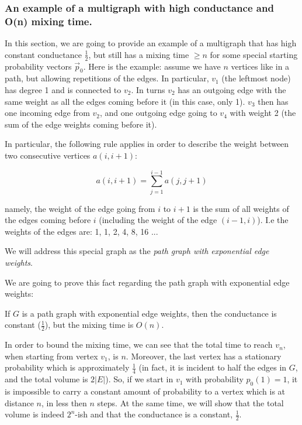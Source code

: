 \documentclass[../main.tex]{subfiles}
\begin{document}
\subsubsection{An example of a multigraph with high conductance and O(n) mixing time.}
\label{subsubsec:counter_example}

In this section, we are going to provide an example of a multigraph that has high constant conductance $\frac{1}{2}$, but still has a mixing time $\geq n$ for some special starting probability vectors $\vec{p}_0$. 
Here is the example: assume we have $n$ vertices like in a path, but allowing repetitions of the edges. In particular, $v_1$ (the leftmost node) has degree 1 and is connected to $v_2$. In turns $v_2$ has an outgoing edge with the same weight as all the edges coming before it (in this case, only 1). $v_3$ then has one incoming edge from $v_2$, and one outgoing edge going to $v_4$ with weight 2 (the sum of the edge weights coming before it).

In particular, the following rule applies in order to describe the weight between two consecutive vertices $a(i, i+1)$:

\begin{equation}
    a(i, i+1) = \sum_{j=1}^{i-1} a(j, j+1)
\end{equation}

namely, the weight of the edge going from $i$ to $i+1$ is the sum of all weights of the edges coming before $i$ (including the weight of the edge $(i-1, i)$). I.e the weights of the edges are: 1, 1, 2, 4, 8, 16 ...  

We will address this special graph as the \textit{path graph with exponential edge weights}.

We are going to prove this fact regarding the path graph with exponential edge weights:

\begin{claim}
\label{claim:path_graph_high_mixing_time}
    If $G$ is a path graph with exponential edge weights, then the conductance is constant ($\frac{1}{2}$), but the mixing time is $O(n)$.
\end{claim}

In order to bound the mixing time, we can see that the total time to reach $v_n$, when starting from vertex $v_1$, is $n$. Moreover, the last vertex has a stationary probability which is approximately $\frac{1}{4}$ (in fact, it is incident to half the edges in $G$, and the total volume is $2|E|$). So, if we start in $v_1$ with probability $p_0(1) = 1$, it is impossible to carry a constant amount of probability to a vertex which is at distance $n$, in less then $n$ steps. At the same time, we will show that the total volume is indeed $2^n$-ish and that the conductance is a constant, $\frac{1}{2}$.
\end{document}
